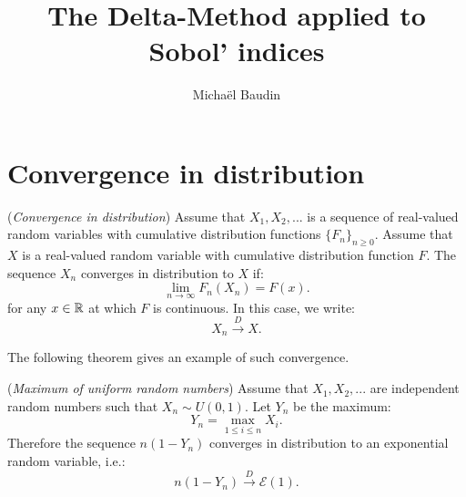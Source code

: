 \documentclass{article}
\begin{document}
\title{The Delta-Method applied to Sobol' indices}

\author{Michaël Baudin}

\maketitle



\tableofcontents


\section{Convergence in distribution}

\begin{definition}
\label{def-convdistr}
(\emph{Convergence in distribution})
Assume that $X_1,X_2,...$ is a sequence of real-valued random variables 
with cumulative distribution functions $\{F_n\}_{n\geq 0}$. 
Assume that $X$ is a real-valued random variable 
with cumulative distribution function $F$. 
The sequence $X_n$ converges in distribution to $X$ if:
$$
\lim_{n\rightarrow \infty} F_n(X_n)=F(x).
$$
for any $x\in \mathbb{R}$ at which $F$ is continuous.
In this case, we write:
$$
X_n \xrightarrow{D} X.
$$
\end{definition}

The following theorem gives an example of such convergence. 

\begin{theorem}
(\emph{Maximum of uniform random numbers})
Assume that $X_1,X_2,...$ are independent random numbers such that $X_n\sim U(0,1)$. 
Let $Y_n$ be the maximum:
$$
Y_n = \max_{1\leq i\leq n}  X_i.
$$
Therefore the sequence $n(1-Y_n)$ converges in distribution to an exponential random variable, i.e.:
$$
n(1-Y_n) \xrightarrow{D} \mathcal{E}(1).
$$
\end{theorem}
\end{document}
